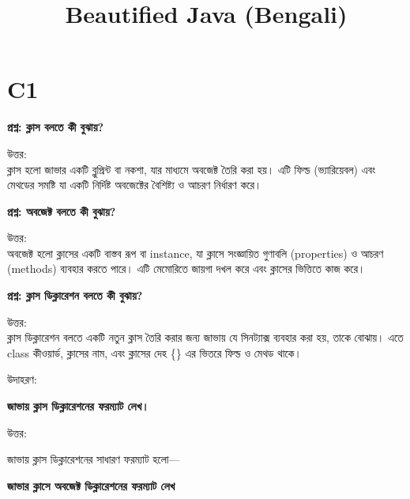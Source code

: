 \documentclass[12pt]{article}
\title{Beautified Java (Bengali)}
\author{}
\date{}
\begin{document}
\maketitle
\tableofcontents
\vspace{1cm}

\section*{C1}

\textbf{প্রশ্ন: ক্লাস বলতে কী বুঝায়?}

উত্তর:  \\
ক্লাস হলো জাভার একটি ব্লুপ্রিন্ট বা নকশা, যার মাধ্যমে অবজেক্ট তৈরি করা হয়। এটি ফিল্ড (ভ্যারিয়েবল) এবং মেথডের সমষ্টি যা একটি নির্দিষ্ট অবজেক্টের বৈশিষ্ট্য ও আচরণ নির্ধারণ করে।

\vspace{0.5em}
\textbf{প্রশ্ন: অবজেক্ট বলতে কী বুঝায়?}

উত্তর:  \\
অবজেক্ট হলো ক্লাসের একটি বাস্তব রূপ বা instance, যা ক্লাসে সংজ্ঞায়িত গুণাবলি (properties) ও আচরণ (methods) ব্যবহার করতে পারে। এটি মেমোরিতে জায়গা দখল করে এবং ক্লাসের ভিত্তিতে কাজ করে।

\vspace{0.5em}
\textbf{প্রশ্ন: ক্লাস ডিক্লারেশন বলতে কী বুঝায়?}

উত্তর:  \\
ক্লাস ডিক্লারেশন বলতে একটি নতুন ক্লাস তৈরি করার জন্য জাভায় যে সিনট্যাক্স ব্যবহার করা হয়, তাকে বোঝায়। এতে class কীওয়ার্ড, ক্লাসের নাম, এবং ক্লাসের দেহ \{\} এর ভিতরে ফিল্ড ও মেথড থাকে।

উদাহরণ:


\vspace{0.5em}
\textbf{জাভায় ক্লাস ডিক্লারেশনের ফরম্যাট লেখ।}

উত্তর:

জাভায় ক্লাস ডিক্লারেশনের সাধারণ ফরম্যাট হলো—


\vspace{0.5em}
\textbf{জাভার ক্লাসে অবজেক্ট ডিক্লারেশনের ফরম্যাট লেখ}
\end{document}
